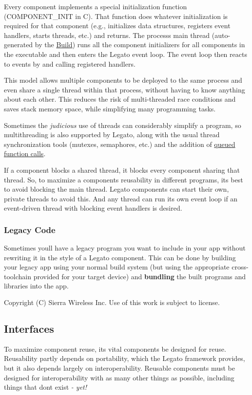Every component implements a special initialization function ({\ttfamily C\+O\+M\+P\+O\+N\+E\+N\+T\+\_\+\+I\+N\+I\+T} in C). That function does whatever initialization is required for that component (e.\+g., initializes data structures, registers event handlers, starts threads, etc.) and returns. The process\textquotesingle{}s main thread (auto-\/generated by the \hyperlink{buildTools}{Build}) runs all the component initializers for all components in the executable and then enters the Legato event loop. The event loop then reacts to events by and calling registered handlers.

This model allows multiple components to be deployed to the same process and even share a single thread within that process, without having to know anything about each other. This reduces the risk of multi-\/threaded race conditions and saves stack memory space, while simplifying many programming tasks.

Sometimes the {\itshape judicious} use of threads can considerably simplify a program, so multithreading is also supported by Legato, along with the usual thread synchronization tools (mutexes, semaphores, etc.) and the addition of \hyperlink{c_event_loop_c_event_dispatchingToOtherThreads}{queued function calls}.

If a component blocks a shared thread, it blocks every component sharing that thread. So, to maximize a component\textquotesingle{}s reusability in different programs, it\textquotesingle{}s best to avoid blocking the main thread. Legato components can start their own, private threads to avoid this. And any thread can run its own event loop if an event-\/driven thread with blocking event handlers is desired.\hypertarget{basic_components_basicComponentsLegacyCode}{}\subsubsection{Legacy Code}\label{basic_components_basicComponentsLegacyCode}
Sometimes you\textquotesingle{}ll have a legacy program you want to include in your app without rewriting it in the style of a Legato component. This can be done by building your legacy app using your normal build system (but using the appropriate cross-\/toolchain provided for your target device) and {\bfseries bundling} the built programs and libraries into the app.





Copyright (C) Sierra Wireless Inc. Use of this work is subject to license. \hypertarget{basicInterfaces}{}\subsection{Interfaces}\label{basicInterfaces}
To maximize component reuse, it\textquotesingle{}s vital components be designed for reuse. Reusability partly depends on portability, which the Legato framework provides, but it also depends largely on interoperability. Reusable components must be designed for interoperability with as many other things as possible, including things that don\textquotesingle{}t exist {\itshape -\/ yet! }

